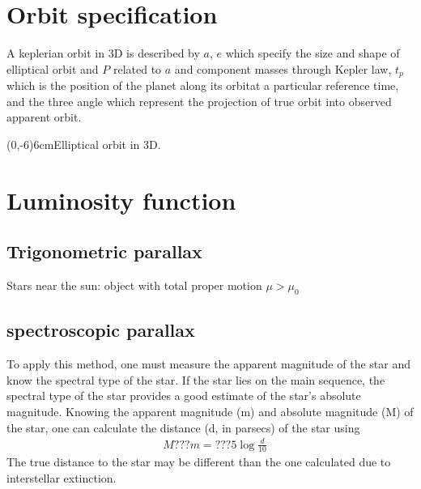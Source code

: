 \documentclass[oneside,12pt,fleqn]{memoir}
\begin{document}
\section{Orbit specification}

A keplerian orbit in 3D is described by $a$, $e$ which specify the size and shape of elliptical orbit and $P$ related to $a$ and component masses through Kepler law, $t_p$ which is the position of the planet along its orbitat a particular reference time, and the three angle  which represent the projection of true orbit into observed apparent orbit.



{(0,-6)}{6cm}{Elliptical orbit in 3D.}

\section{Luminosity function} 

\subsection{Trigonometric parallax}

Stars near the sun: object with total proper motion $\mu>\mu_0$

\subsection{spectroscopic parallax}

To apply this method, one must measure the apparent magnitude of the star and know the spectral type of the star. If the star lies on the main sequence, the spectral type of the star provides a good estimate of the star's absolute magnitude. Knowing the apparent magnitude (m) and absolute magnitude (M) of the star, one can calculate the distance (d, in parsecs) of the star using
\begin{align*}
&M ??? m = ??? 5\log{\frac{d}{10}}    
\end{align*}
The true distance to the star may be different than the one calculated due to interstellar extinction.
\end{document}
